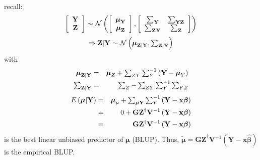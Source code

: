 \documentclass{article}
\begin{document}
recall: 
\begin{equation*}
\left[ 
\begin{array}{c}
\mathbf{Y} \\ 
\mathbf{Z}%
\end{array}%
\right] \sim \mathcal{N}\left( \left[ 
\begin{array}{c}
\mathbf{\mu }_{\mathbf{Y}} \\ 
\mathbf{\mu }_{\mathbf{Z}}%
\end{array}%
\right] ,\left[ 
\begin{array}{cc}
\tsum\nolimits_{\mathbf{Y}} & \tsum\nolimits_{\mathbf{YZ}} \\ 
\tsum\nolimits_{\mathbf{ZY}} & \tsum\nolimits_{\mathbf{Z}}%
\end{array}%
\right] \right)
\end{equation*}%
\begin{equation*}
\Rightarrow \mathbf{Z}|\mathbf{Y}\sim \mathcal{N}\left( \mathbf{\mu }_{%
\mathbf{Z}|\mathbf{Y}},\tsum\nolimits_{\mathbf{Z}|\mathbf{Y}}\right)
\end{equation*}%
with%
\begin{eqnarray*}
\mathbf{\mu }_{\mathbf{Z}|\mathbf{Y}} &=&\mathbf{\mu }_{Z}+\tsum%
\nolimits_{ZY}\tsum\nolimits_{Y}^{-1}\left( \mathbf{Y}-\mathbf{\mu }%
_{Y}\right) \\
\tsum\nolimits_{\mathbf{Z}|\mathbf{Y}}
&=&\tsum\nolimits_{Z}-\tsum\nolimits_{ZY}\tsum\nolimits_{Y}^{-1}\tsum%
\nolimits_{YZ}
\end{eqnarray*}%
\begin{eqnarray*}
E\left( \mathbf{\mu }|\mathbf{Y}\right) &=&\mathbf{\mu }_{\mu
}+\tsum\nolimits_{\mathbf{\mu Y}}\tsum\nolimits_{Y}^{-1}\left( \mathbf{%
Y-x\beta }\right) \\
&=&0+\mathbf{GZ}^{\dagger }\mathbf{V}^{-1}\left( \mathbf{Y-x\beta }\right) \\
&=&\mathbf{GZ}^{\dagger }\mathbf{V}^{-1}\left( \mathbf{Y-x\beta }\right)
\end{eqnarray*}%
is the best linear unbiased predictor of $\mathbf{\mu }$ (BLUP).\newline
\newline
Thus, $\mathbf{\tilde{\mu}=GZ}^{\dagger }\mathbf{V}^{-1}\left( \mathbf{Y-x%
\hat{\beta}}\right) $ is the empirical BLUP.
\end{document}
